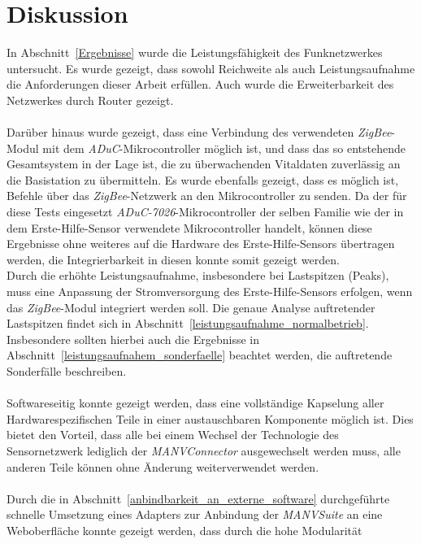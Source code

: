 
\chapter{Diskussion} 
In Abschnitt~\ref{Ergebnisse} wurde die Leistungsfähigkeit des Funknetzwerkes untersucht.
Es wurde gezeigt, dass sowohl Reichweite als auch Leistungsaufnahme die Anforderungen
dieser Arbeit erfüllen. Auch wurde die Erweiterbarkeit des Netzwerkes durch Router gezeigt.\\
\\
Darüber hinaus wurde gezeigt, dass eine Verbindung des verwendeten \emph{ZigBee}-Modul
mit dem \emph{ADuC}-Mikrocontroller möglich ist, und dass das so entstehende Gesamtsystem
in der Lage ist, die zu überwachenden Vitaldaten zuverlässig an die Basistation zu übermitteln.
Es wurde ebenfalls gezeigt, dass es möglich ist, Befehle über das \emph{ZigBee}-Netzwerk
an den Mikrocontroller zu senden. Da der für diese Tests eingesetzt \emph{ADuC-7026}-Mikrocontroller
der selben Familie wie der in dem Erste-Hilfe-Sensor verwendete Mikrocontroller handelt,
können diese Ergebnisse ohne weiteres auf die Hardware des Erste-Hilfe-Sensors übertragen werden, 
die Integrierbarkeit in diesen konnte somit gezeigt werden.\\
Durch die erhöhte Leistungsaufnahme, insbesondere bei Lastspitzen (Peaks), muss eine Anpassung
der Stromversorgung des Erste-Hilfe-Sensors erfolgen, wenn das \emph{ZigBee}-Modul integriert
werden soll. Die genaue Analyse auftretender Lastspitzen findet sich in Abschnitt~\ref{leistungsaufnahme_normalbetrieb}.
Insbesondere sollten hierbei auch die Ergebnisse in Abschnitt~\ref{leistungsaufnahem_sonderfaelle} beachtet 
werden, die auftretende Sonderfälle beschreiben.\\
\\
Softwareseitig konnte gezeigt werden, dass eine vollständige Kapselung aller Hardwarespezifischen Teile
in einer austauschbaren Komponente möglich ist. Dies bietet den Vorteil, dass alle bei einem Wechsel 
der Technologie des Sensornetzwerk lediglich der \emph{MANVConnector} ausgewechselt werden muss,
alle anderen Teile können ohne Änderung weiterverwendet werden.\\
\\
Durch die in Abschnitt~\ref{anbindbarkeit_an_externe_software} durchgeführte schnelle Umsetzung eines Adapters 
zur Anbindung der \emph{MANVSuite} an eine Weboberfläche konnte gezeigt werden, dass durch die hohe Modularität
